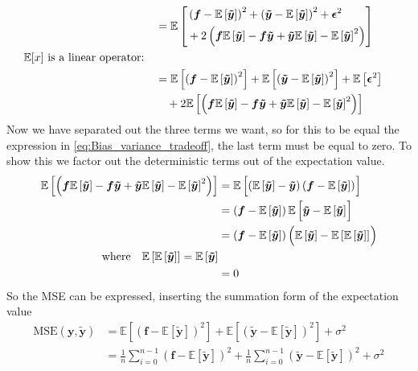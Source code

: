 \documentclass[10pt, twocolumn]{article}
\providecommand{\forv}[1]
{
\ensuremath{\mathbb{E}\left[#1\right]}
}
\providecommand{\forvsum}[1]
{
\ensuremath{\frac{1}{n}\sum_{i=0}^{n-1} #1}
}
\providecommand{\bmt}[1]
{
\ensuremath{\bm{\tilde{#1}}}
}
\begin{document}
\begin{appendices}
\begin{align*}
    \\
    &= \forv{
        \begin{aligned}
        &\left(\bm{f}-\forv{\bmt{y}}\right)^2 + \left(\bmt{y}-\forv{\bmt{y}}\right)^2 + \bm{\epsilon}^2
        \\
        & + 2 \left(\bm{f}\forv{\bmt{y}} - \bm{f}\bmt{y} + \bmt{y}\forv{\bmt{y}} - \forv{\bmt{y}}^2\right)
        \end{aligned}
        }
    \\
    \qq*{\text{$\mathbb{E}[x]$} is a linear operator:}
    \\
    &=
        \forv{\left(\bm{f}-\forv{\bmt{y}}\right)^2} +         \forv{\left(\bmt{y}-\forv{\bmt{y}}\right)^2} +         \forv{\bm{\epsilon}^2} 
        \\
        &\quad + 2 \forv{\left(\bm{f}\forv{\bmt{y}} - \bm{f}\bmt{y} +  \bmt{y}\forv{\bmt{y}} - \forv{\bmt{y}}^2\right)}
\end{align*}
Now we have separated out the three terms we want, so for this to be equal the expression in \cref{eq:Bias_variance_tradeoff}, the last term must be equal to zero. To show this we factor out the deterministic terms out of the expectation value.
\begin{align*}
    \forv{\left(\bm{f}\forv{\bmt{y}} - \bm{f}\bmt{y} +  \bmt{y}\forv{\bmt{y}} - \forv{\bmt{y}}^2\right)}
    &=
    \forv{\left(\forv{\bmt{y}}-\bmt{y}\right)\left(\bm{f}-\forv{\bmt{y}}\right)^{\vphantom{2}}}
    \\
    &=
    \left(\bm{f}-\forv{\bmt{y}}\right)\forv{\bmt{y}-\forv{\bmt{y}}^{\vphantom{2}}}
    \\
    &=
    \left(\bm{f}-\forv{\bmt{y}}\right)\left(\forv{\bmt{y}}-\forv{\forv{{\bmt{y}}}}^{\vphantom{2}}\right)
    \\
    \qq*{where}\forv{\forv{\bmt{y}}} = \forv{\bmt{y}}
    \\
    &= 0
\end{align*}
So the MSE can be expressed, inserting the summation form of the expectation value
\begin{align*}
    \text{MSE}\left(\bm{y},\bmt{y}\right) &=    \forv{\left(\bm{f}-\forv{\bmt{y}}\right)^2} +         \forv{\left(\bmt{y}-\forv{\bmt{y}}\right)^2} + \sigma^2
    \\
    &= \forvsum{\left(\bm{f}-\forv{\bmt{y}}\right)^2} + \forvsum{\left(\bmt{y}-\forv{\bmt{y}}\right)^2} + \sigma^2
\end{align*}

\newpage

\end{appendices}
\end{document}
